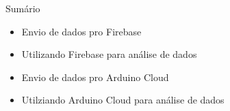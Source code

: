 \begin{frame}{Sumário}
    \begin{itemize}
        \item Envio de dados pro Firebase
        \item Utilizando Firebase para análise de dados
        \item Envio de dados pro Arduino Cloud
        \item Utilziando Arduino Cloud para análise de dados
    \end{itemize}
\end{frame}